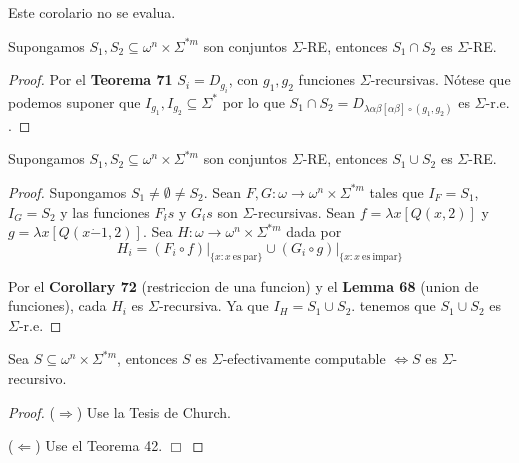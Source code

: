   \begin{corollary}
    \PN Este corolario no se evalua.
  \end{corollary}

  \begin{corollary}
    \PN Supongamos $S_{1}, S_{2} \subseteq \omega^{n} \times \Sigma^{\ast m}$ son conjuntos $\Sigma$-RE, entonces
    $S_{1} \cap S_{2}$ es $\Sigma$-RE.
  \end{corollary}
  \begin{proof}
    Por el \textbf{Teorema 71} $S_{i}=D_{g_{i}}$, con $g_{1},g_{2}$ funciones $ \Sigma $-recursivas$.$
    Nótese que podemos suponer que $I_{g_{1}},I_{g_{2}} \subseteq \Sigma^{\ast} $ por lo que
    $S_{1}\cap S_{2}=D_{\lambda \alpha\beta \left[ \alpha\beta\right] \circ (g_{1},g_{2})}$ es $\Sigma $-r.e.$.$
  \end{proof}

  \begin{corollary}
    \PN Supongamos $S_{1}, S_{2} \subseteq \omega^{n} \times \Sigma^{\ast m}$ son conjuntos $\Sigma$-RE, entonces
    $S_{1} \cup S_{2}$ es $\Sigma$-RE.
  \end{corollary}
  \begin{proof}
    Supongamos $S_{1}\neq \emptyset \neq S_{2}.$ Sean $F,G:\omega \rightarrow \omega^{n} \times \Sigma^{\ast m}$
    tales que $I_{F}=S_{1}$, $I_{G}=S_{2}$ y las funciones $F_{i} {\acute{}} s$ y $G_{i} {\acute{}} s$ son
    $\Sigma $-recursivas. Sean $f=\lambda x\left[ Q(x,2)\right] $ y $ g=\lambda x\left[ Q(x\dot{-}1,2)\right] .$
    Sea $H:\omega \rightarrow \omega^{n} \times \Sigma^{\ast m}$ dada por
    \[
      \displaystyle H_{i}=(F_{i}\circ f)\mathrm{\mid }_{\{x:x\mathrm{\ es\ par}\}}\cup (G_{i}\circ g)
      \mathrm{\mid }_{\{x:x\mathrm{\ es\ impar}\}}
    \]

    Por el \textbf{Corollary 72} (restriccion de una funcion) y el \textbf{Lemma 68} (union de funciones),
    cada $H_{i}$ es $ \Sigma $-recursiva. Ya que $I_{H}=S_{1}\cup S_{2}$.
    tenemos que $S_{1}\cup S_{2}$ es $\Sigma $-r.e.
  \end{proof}

  \begin{theorem}
     \PN Sea $S \subseteq \omega^{n} \times \Sigma^{\ast m}$, entonces $S$ es $\Sigma$-efectivamente computable
     $\Leftrightarrow S$ es $\Sigma$-recursivo.
  \end{theorem}
  \begin{proof}
    ($\Rightarrow $) Use la Tesis de Church.

    ($\Leftarrow $) Use el Teorema 42. $\Box$
  \end{proof}

